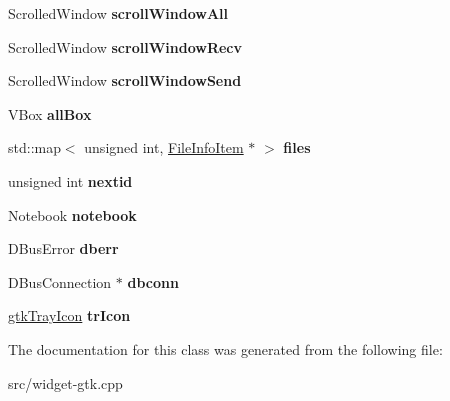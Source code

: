 \begin{DoxyCompactItemize}
\item 
\hypertarget{classinstSendWidget_ac76f8d942fefe4f4b810de2173de9407}{\-Scrolled\-Window {\bfseries scroll\-Window\-All}}\label{classinstSendWidget_ac76f8d942fefe4f4b810de2173de9407}

\item 
\hypertarget{classinstSendWidget_aabd97dd58c1f3c5560d365226e42a7f7}{\-Scrolled\-Window {\bfseries scroll\-Window\-Recv}}\label{classinstSendWidget_aabd97dd58c1f3c5560d365226e42a7f7}

\item 
\hypertarget{classinstSendWidget_a66f87351f59d013c874e996e17c08914}{\-Scrolled\-Window {\bfseries scroll\-Window\-Send}}\label{classinstSendWidget_a66f87351f59d013c874e996e17c08914}

\item 
\hypertarget{classinstSendWidget_a414b94531e16e3ccf14ddf8647de5b8d}{\-V\-Box {\bfseries all\-Box}}\label{classinstSendWidget_a414b94531e16e3ccf14ddf8647de5b8d}

\item 
\hypertarget{classinstSendWidget_a68f4337f7e51064ca697974c2a2ed136}{std\-::map$<$ unsigned int, \*
\hyperlink{classFileInfoItem}{\-File\-Info\-Item} $\ast$ $>$ {\bfseries files}}\label{classinstSendWidget_a68f4337f7e51064ca697974c2a2ed136}

\item 
\hypertarget{classinstSendWidget_a9426f91f1218912fa5b8f3493c8d7fd5}{unsigned int {\bfseries nextid}}\label{classinstSendWidget_a9426f91f1218912fa5b8f3493c8d7fd5}

\item 
\hypertarget{classinstSendWidget_aa775c313536882fe723432fd67afe025}{\-Notebook {\bfseries notebook}}\label{classinstSendWidget_aa775c313536882fe723432fd67afe025}

\item 
\hypertarget{classinstSendWidget_a14f02ed5957bfe560a37d0fbc8f0db6c}{\-D\-Bus\-Error {\bfseries dberr}}\label{classinstSendWidget_a14f02ed5957bfe560a37d0fbc8f0db6c}

\item 
\hypertarget{classinstSendWidget_a756833c5f1f9647f5d643d82cf1db849}{\-D\-Bus\-Connection $\ast$ {\bfseries dbconn}}\label{classinstSendWidget_a756833c5f1f9647f5d643d82cf1db849}

\item 
\hypertarget{classinstSendWidget_af0421447c6aafe2f5d376f0e70082d36}{\hyperlink{classgtkTrayIcon}{gtk\-Tray\-Icon} {\bfseries tr\-Icon}}\label{classinstSendWidget_af0421447c6aafe2f5d376f0e70082d36}

\end{DoxyCompactItemize}


\-The documentation for this class was generated from the following file\-:\begin{DoxyCompactItemize}
\item 
src/widget-\/gtk.\-cpp\end{DoxyCompactItemize}
